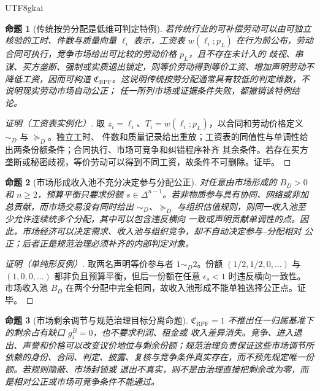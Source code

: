 \documentclass[12pt,a4paper,openany]{report}
\newtheorem{proposition}{命题}[chapter]
\begin{document}
\begin{CJK*}{UTF8}{gkai}
\begin{proposition}[传统按劳分配是低维可判定特例]
\label{prop:labor-distribution-special-case}
若传统行业的可补偿劳动可以由可独立核验的工时、件数与质量向量 \(\ell_i\) 表示，工资表
\(w(\ell_i;p_L)\) 在行为前公布，劳动合同可执行，竞争市场给出可比较的劳动价格 \(p_L\)，且不存在未计入的
歧视、串谋、买方垄断、强制或实质退出锁定，则等价劳动得到等价工资、增加声明劳动不降低工资，因而可构造
\(\mathfrak C_{\mathrm{RPF}}\)。这说明传统按劳分配通常具有较低的判定维数，不说明现实劳动市场自动公正；
任一所列市场或证据条件失败，都撤销该特例结论。
\end{proposition}

\begin{proof}[证明（工资表实例化）]
取 \(z_i=\ell_i\)、\(T_i=w(\ell_i;p_L)\)，以合同和劳动价格定义 \(\sim_D\) 与 \(\succeq_D\)。独立工时、
件数和质量记录给出重放；工资表的同值性与单调性给出两条份额条件；合同执行、市场可竞争和纠错程序补齐
其余条件。若存在买方垄断或秘密歧视，等价劳动可以得到不同工资，故条件不可删除。证毕。
\end{proof}

\begin{proposition}[市场形成收入池不充分决定参与分配公正]
\label{prop:market-pool-not-fair-allocation}
对任意由市场形成的 \(B_D>0\) 和 \(n\ge2\)，预算平衡只要求份额
\(s\in\Delta^{n-1}\)。若非物质参与具有协同、网络或非加总贡献，而市场交易没有同时给出
\(\sim_D\)、\(\succeq_D\) 与组织估值规则，则同一收入池至少允许连续统多个分配，其中可以包含违反横向
一致或声明贡献单调性的点。因此，市场经济可以决定需求、收入池与组织竞争，却不自动决定参与--分配相对
公正；后者正是规范治理必须补齐的内部判定对象。
\end{proposition}

\begin{proof}[证明（单纯形反例）]
取两名声明等价参与者 \(1\sim_D2\)。份额 \((1/2,1/2,0,\ldots)\) 与
\((1,0,0,\ldots)\) 都非负且预算平衡，但后一份额在任意 \(\epsilon_s<1\) 时违反横向一致性。市场收入池
\(B_D\) 在两个分配中完全相同，故收入池形成不能单独选择公正点。证毕。
\end{proof}

\begin{proposition}[市场剩余调节与规范治理目标分离命题]
\label{prop:market-surplus-governance-separation}
\(\mathfrak C_{\mathrm{RPF}}=1\) 不推出任一归属基准下的剩余占有缺口 \(g_i^B=0\)，也不要求利润、租金或
收入差异消失。竞争、进入退出、声誉和价格可以改变议价地位与剩余份额；规范治理负责保证这些市场调节所
依赖的身份、合同、判定、披露、复核与竞争条件真实存在，而不预先规定唯一份额。若规则隐蔽、市场封锁或
退出不真实，则不是由治理直接把剩余改为零，而是相对公正或市场可竞争条件不能通过。
\end{proposition}


\end{CJK*}
\end{document}

